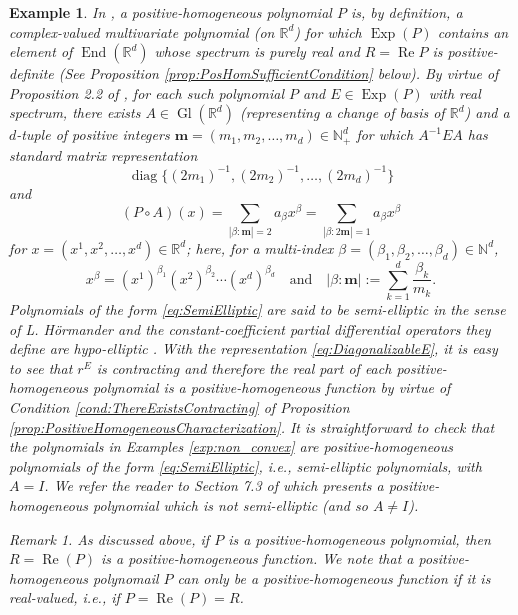 \documentclass[11pt]{article}
\newtheorem{example}{Example}
\theoremstyle{remark}
\newtheorem{remark}{Remark}
\renewcommand\Re{\operatorname{Re}}%
\newcommand\End{\operatorname{End}} %
\newcommand\Gl{\operatorname{Gl}} %
\newcommand\Exp{\operatorname{Exp}}
\newcommand\diag{\operatorname{diag}}
\begin{document}
\begin{example}\label{exp:Polynomial}\normalfont
 In \cite{Randles2017}, a positive-homogeneous polynomial $P$ is, by definition, a complex-valued multivariate polynomial (on $\mathbb{R}^d$) for which $\Exp(P)$ contains an element of $\End(\mathbb{R}^d)$ whose spectrum is purely real and $R=\Re P$ is positive-definite (See Proposition \ref{prop:PosHomSufficientCondition} below). By virtue of Proposition 2.2 of \cite{Randles2017}, for each such polynomial $P$ and $E\in\Exp(P)$ with real spectrum, there exists $A\in\Gl(\mathbb{R}^d)$ (representing a change of basis of $\mathbb{R}^d$) and a $d$-tuple of positive integers $\mathbf{m}=(m_1,m_2,\dots,m_d)\in\mathbb{N}_+^d$ for which $A^{-1}EA$ has standard matrix representation
\begin{equation}\label{eq:DiagonalizableE}
\diag\{(2m_1)^{-1},(2m_2)^{-1},\dots,(2m_d)^{-1}\}
\end{equation}
and
\begin{equation}\label{eq:SemiElliptic}
(P\circ A)(x)=\sum_{|\beta:\mathbf{m}|=2}a_\beta x^\beta=\sum_{|\beta:2\mathbf{m}|=1}a_\beta x^\beta
\end{equation}
for $x=(x^1,x^2,\dots,x^d)\in\mathbb{R}^d$; here, for a multi-index $\beta=(\beta_1,\beta_2,\dots,\beta_d)\in\mathbb{N}^d$,
\begin{equation*}
x^{\beta}=(x^1)^{\beta_1}(x^2)^{\beta_2}\cdots (x^d)^{\beta_d} \quad \mbox{and} \quad |\beta:\mathbf{m}|:=\sum_{k=1}^d\frac{\beta_k}{m_k}.
\end{equation*}
Polynomials of the form \eqref{eq:SemiElliptic} are said to be semi-elliptic in the sense of L. H\"{o}rmander and the constant-coefficient partial differential operators they define are hypo-elliptic \cite{Hormander1983}. With the representation \eqref{eq:DiagonalizableE}, it is easy to see that $r^{E}$ is contracting and therefore the real part of each positive-homogeneous polynomial is a positive-homogeneous function by virtue of Condition \ref{cond:ThereExistsContracting} of Proposition \ref{prop:PositiveHomogeneousCharacterization}. It is straightforward to check that the polynomials in Examples \ref{exp:non_convex} are positive-homogeneous polynomials of the form \eqref{eq:SemiElliptic}, i.e., semi-elliptic polynomials, with $A=I$. We refer the reader to Section 7.3 of \cite{Randles2017} which presents a positive-homogeneous polynomial which is not semi-elliptic (and so $A\neq I$).

\begin{remark}\label{rmk:PositiveHomogeneousPolynomialsVSFunctions} As discussed above, if $P$ is a positive-homogeneous polynomial, then $R=\Re(P)$ is a positive-homogeneous function. We note that a positive-homogeneous polynomail $P$ can only be a positive-homogeneous function if it is real-valued, i.e.,  if $P=\Re(P)=R$.
\end{remark}
\end{example}
\end{document}
